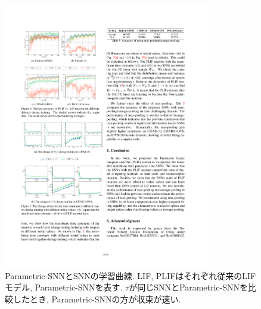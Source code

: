\begin{figure}[t]
    \centering
    \includegraphics[width=0.8\textwidth]{Static/chap1_paramsnn_traincurve.pdf}
    \caption[Parametric-SNNとSNNの学習曲線]{
        Parametric-SNNとSNNの学習曲線\cite{paramsnn}.
        LIF, PLIFはそれぞれ従来のLIFモデル, Parametric-SNNを表す.
        $\tau$が同じSNNとParametric-SNNを比較したとき, Parametric-SNNの方が収束が速い.
    }
    \label{fig:paramsnn:traincurve}
\end{figure}


